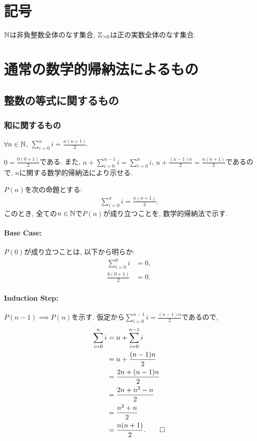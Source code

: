 \section{記号}
$\mathbb{N}$は非負整数全体のなす集合,
$\mathbb{Z}_{>0}$は正の実数全体のなす集合.
\section{通常の数学的帰納法によるもの}
\subsection{整数の等式に関するもの}
\subsubsection{和に関するもの}
\begin{prop}
  $\forall n\in\mathbb{N}$,
  $\sum_{i=0}^{n}i=\frac{n(n+1)}{2}$.
\end{prop}
\begin{proof**}
  $0=\frac{0(0+1)}{2}$である.
  また,
  $n+\sum_{i=0}^{n-1}i=\sum_{i=0}^{n}i$,
  $n+\frac{(n-1)n}{2}=\frac{n(n+1)}{2}$であるので,
  $n$に関する数学的帰納法により示せる.
\end{proof**}
\begin{proof*}
  $P(n)$を次の命題とする:
  \begin{align*}
    \sum_{i=0}^{n}i=\frac{n(n+1)}{2}.
  \end{align*}
  このとき, 全ての$n\in\mathbb{N}$で$P(n)$が成り立つことを,
  数学的帰納法で示す.

  \paragraph{Base Case:}
  $P(0)$が成り立つことは, 以下から明らか:
  \begin{align*}
    \sum_{i=0}^{0}i&=0,\\
    \frac{0(0+1)}{2}&=0.
  \end{align*}

  \paragraph{Induction Step:}
  $P(n-1)\implies P(n)$を示す.
  仮定から$\sum_{i=0}^{n-1}i=\frac{(n-1)n}{2}$であるので,
  \begin{align*}
    \sum_{i=0}^{n}i&=n+\sum_{i=0}^{n-1}i\\
    &=n+\frac{(n-1)n}{2}\\
    &=\frac{2n+(n-1)n}{2}\\
    &=\frac{2n+n^2-n}{2}\\
    &=\frac{n^2+n}{2}\\
    &=\frac{n(n+1)}{2}.
    \qedhere
  \end{align*}
\end{proof*}
